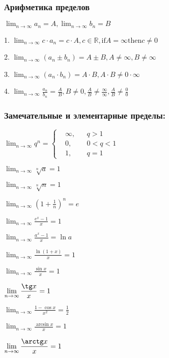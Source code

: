 \subsubsection{Арифметика пределов}

$\displaystyle \lim_{n\to \infty} a_n = A, \lim_{n\to \infty} b_n = B $

1. $\displaystyle \lim_{n\to \infty} c\cdot a_n = c\cdot A, c \in \mathbb{R}, \text{if} A = \infty \text{then} c \neq 0  $

2. $\displaystyle \lim_{n\to \infty} (a_n \pm b_n) = A\pm B, A\neq\infty, B\neq\infty $

3. $\displaystyle \lim_{n\to \infty} (a_n\cdot b_n) = A\cdot B, A\cdot B \neq 0\cdot\infty $

4. $\displaystyle \lim_{n\to \infty} \frac{a_n}{b_n} = \frac{A}{B}, B\neq 0, \frac{A}{B} \neq \frac{\infty}{\infty}, \frac{A}{B} \neq \frac{0}{0} $

\subsubsection{Замечательные и элементарные пределы:}

$\displaystyle \lim_{n\to \infty} q^n = \left\{ \begin{aligned}
		&\infty, &&q > 1 \\
		&0, &&0 < q < 1 \\
		&1, &&q = 1
	\end{aligned} \right. $

$\displaystyle \lim_{n\to \infty} \sqrt[n]{a} = 1 $

$\displaystyle \lim_{n\to \infty} \sqrt[n]{n} = 1 $

$\displaystyle \lim_{n\to \infty} \left( 1 + \frac{1}{n} \right)^n = e $

$\displaystyle \lim_{n\to \infty} \frac{e^x - 1}{x} = 1 $

$\displaystyle \lim_{n\to \infty} \frac{a^x - 1}{x} = \ln a $

$\displaystyle \lim_{n\to \infty} \frac{\ln(1+x)}{x} = 1 $

$\displaystyle \lim_{n\to \infty} \frac{\sin x}{x} = 1 $

$\displaystyle \lim_{n\to \infty} \frac{\tg x}{x} = 1 $

$\displaystyle \lim_{n\to \infty} \frac{1 - \cos x}{x^2} = \frac12 $

$\displaystyle \lim_{n\to \infty} \frac{\arcsin x}{x} = 1 $

$\displaystyle \lim_{n\to \infty} \frac{\arctg x}{x} = 1 $

